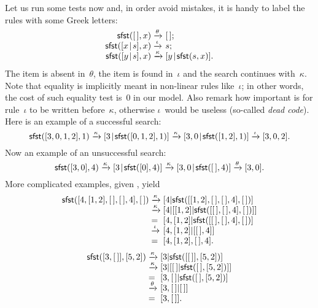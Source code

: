 Let us run some tests now and, in order avoid mistakes, it is handy to
label the rules with some Greek letters:
\begin{equation*}
\begin{array}{r@{\;}l@{\;}l}
\fun{sfst}(\el,x)          & \smashedrightarrow{\theta} & \el;\\
\fun{sfst}(\cons{x}{s},x)  & \smashedrightarrow{\iota}  & s;\\
\fun{sfst}(\cons{y}{s},x)  & \smashedrightarrow{\kappa} &
\cons{y}{\fun{sfst}(s,x)}.
\end{array}
\end{equation*}
The item is absent in~\(\theta\), the item is found in~\(\iota\) and
the search continues with~\(\kappa\). Note that equality is implicitly
meant in non\hyp{}linear rules like~\(\iota\); in other words, the
cost of such equality test is~\(0\) in our model. Also remark how
important is for rule~\(\iota\) to be written before~\(\kappa\),
otherwise \(\iota\)~would be useless (so\hyp{}called \emph{dead
  code}). Here is an
example of a successful search:
\begin{equation*}
\textsf{sfst}([3,0,1,2],1) \xrightarrow{\smash{\kappa}}
[{3}\!\mid\!{\textsf{sfst}([0,1,2],1)}] \xrightarrow{\smash{\kappa}}
[{3,0}\!\mid\!{\textsf{sfst}([1,2],1)}] \xrightarrow{\smash{\iota}} [3,0,2].
\end{equation*}
Now an example of an unsuccessful search:
\begin{equation*}
\textsf{sfst}([3,0],4) \xrightarrow{\smash{\kappa}}
[{3}\!\mid\!{\textsf{sfst}([0],4)}] \xrightarrow{\smash{\kappa}}
[{3,0}\!\mid\!{\textsf{sfst}([\,],4)}] \xrightarrow{\smash{\theta}}
[3,0].
\end{equation*}
More complicated examples, given , yield
\begin{equation*}
\begin{array}{r@{\;}l@{\;}l}
\fun{sfst}([4,[1,2],\el,\el,4],\el)
& \smashedrightarrow{\kappa} &
  [4|\fun{sfst}([[1,2],\el,\el,4],\el)]\\
& \smashedrightarrow{\kappa} &
  [4|[[1,2]|\fun{sfst}([\el,\el,4],\el)]]\\
& = & [4,[1,2]|\fun{sfst}([\el,\el,4],\el)]\\
& \smashedrightarrow{\iota} & [4,[1,2]|[\el,4]]\\
& = & [4,[1,2],\el,4].
\end{array}
\end{equation*}
\begin{equation*}
\begin{array}{r@{\;}l@{\;}l}
\fun{sfst}([3,\el],[5,2])
& \smashedrightarrow{\kappa} & [3|\fun{sfst}([\el],[5,2])]\\
& \smashedrightarrow{\kappa} & [3|[\el|\fun{sfst}(\el,[5,2])]]\\
& = & [3,\el|\fun{sfst}(\el,[5,2])]\\
& \smashedrightarrow{\theta} & [3,\el|\el]\\
& = & [3,\el].
\end{array}
\end{equation*}
